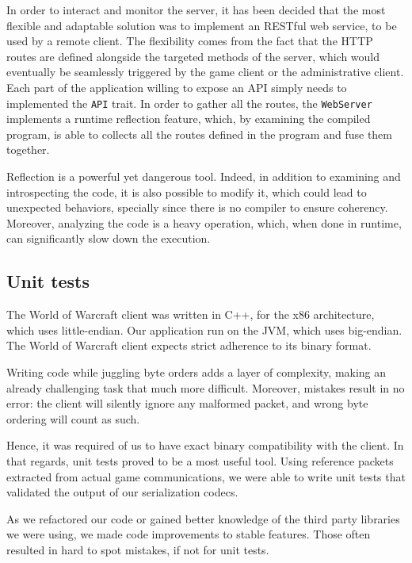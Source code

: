 \documentclass[paper=a4, fontsize=11pt]{scrartcl}
\begin{document}
In order to interact and monitor the server, it has been decided that the most
flexible and adaptable solution was to implement an RESTful web service, to be
used by a remote client.
The flexibility comes from the fact that the HTTP routes are defined alongside
the targeted methods of the server, which would eventually be seamlessly
triggered by the game client or the administrative client.
Each part of the application willing to expose an API simply needs to
implemented the \texttt{API} trait.
In order to gather all the routes, the \texttt{WebServer} implements a
runtime reflection feature, which, by examining the compiled program, is able to
collects all the routes defined in the program and fuse them together.

Reflection is a powerful yet dangerous tool.
Indeed, in addition to examining and introspecting the code, it is also possible
to modify it, which could lead to unexpected behaviors, specially since there is
no compiler to ensure coherency.
Moreover, analyzing the code is a heavy operation, which, when done in runtime,
can significantly slow down the execution.

\subsection{Unit tests}

The World of Warcraft client was written in C++, for the x86 architecture, which
uses little-endian. 
Our application run on the JVM, which uses big-endian.
The World of Warcraft client expects strict adherence to its binary format.

Writing code while juggling byte orders adds a layer of complexity, making an
already challenging task that much more difficult.
Moreover, mistakes result in no error: the client will silently ignore any
malformed packet, and wrong byte ordering will count as such.

Hence, it was required of us to have exact binary compatibility with the client.
In that regards, unit tests proved to be a most useful tool.
Using reference packets extracted from actual game communications, we were able
to write unit tests that validated the output of our serialization codecs.

As we refactored our code or gained better knowledge of the third party
libraries we were using, we made code improvements to stable
features.
Those often resulted in hard to spot mistakes, if not for unit tests.
\end{document}
